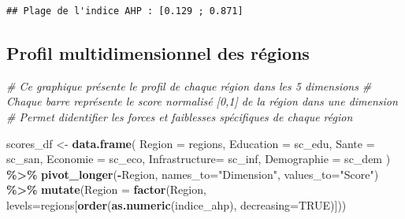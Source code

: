 \documentclass[
]{article}
\newenvironment{Shaded}{\begin{snugshade}}{\end{snugshade}}
\newcommand{\AttributeTok}[1]{\textcolor[rgb]{0.13,0.29,0.53}{#1}}
\newcommand{\CommentTok}[1]{\textcolor[rgb]{0.56,0.35,0.01}{\textit{#1}}}
\newcommand{\ConstantTok}[1]{\textcolor[rgb]{0.56,0.35,0.01}{#1}}
\newcommand{\FunctionTok}[1]{\textcolor[rgb]{0.13,0.29,0.53}{\textbf{#1}}}
\newcommand{\NormalTok}[1]{#1}
\newcommand{\OtherTok}[1]{\textcolor[rgb]{0.56,0.35,0.01}{#1}}
\newcommand{\SpecialCharTok}[1]{\textcolor[rgb]{0.81,0.36,0.00}{\textbf{#1}}}
\newcommand{\StringTok}[1]{\textcolor[rgb]{0.31,0.60,0.02}{#1}}
\begin{document}
\begin{verbatim}
## Plage de l'indice AHP : [0.129 ; 0.871]
\end{verbatim}

\subsection{Profil multidimensionnel des
régions}\label{profil-multidimensionnel-des-ruxe9gions}

\begin{Shaded}
\begin{Highlighting}[]
\CommentTok{\# Ce graphique présente le profil de chaque région dans les 5 dimensions}
\CommentTok{\# Chaque barre représente le score normalisé [0,1] de la région dans une dimension}
\CommentTok{\# Permet d\textquotesingle{}identifier les forces et faiblesses spécifiques de chaque région}

\NormalTok{scores\_df }\OtherTok{\textless{}{-}} \FunctionTok{data.frame}\NormalTok{(}
  \AttributeTok{Region        =}\NormalTok{ regions,}
  \AttributeTok{Education     =}\NormalTok{ sc\_edu,}
  \AttributeTok{Sante         =}\NormalTok{ sc\_san,}
  \AttributeTok{Economie      =}\NormalTok{ sc\_eco,}
  \AttributeTok{Infrastructure=}\NormalTok{ sc\_inf,}
  \AttributeTok{Demographie   =}\NormalTok{ sc\_dem}
\NormalTok{) }\SpecialCharTok{\%\textgreater{}\%}
  \FunctionTok{pivot\_longer}\NormalTok{(}\SpecialCharTok{{-}}\NormalTok{Region, }\AttributeTok{names\_to=}\StringTok{"Dimension"}\NormalTok{, }\AttributeTok{values\_to=}\StringTok{"Score"}\NormalTok{) }\SpecialCharTok{\%\textgreater{}\%}
  \FunctionTok{mutate}\NormalTok{(}\AttributeTok{Region =} \FunctionTok{factor}\NormalTok{(Region,}
                         \AttributeTok{levels=}\NormalTok{regions[}\FunctionTok{order}\NormalTok{(}\FunctionTok{as.numeric}\NormalTok{(indice\_ahp), }\AttributeTok{decreasing=}\ConstantTok{TRUE}\NormalTok{)]))}


\end{Highlighting}
\end{Shaded}
\end{document}
